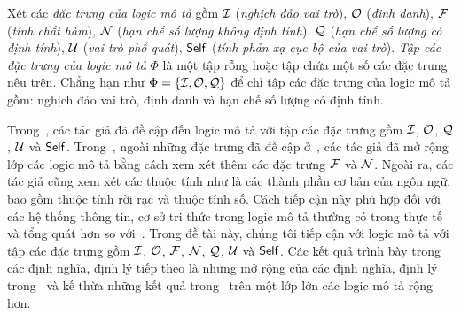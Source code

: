 Xét các {\em đặc trưng của logic mô tả} gồm $\mathcal{I}$ ({\em nghịch đảo vai trò}), $\mathcal{O}$ ({\em định danh}), $\mathcal{F}$ ({\em tính chất hàm}), $\mathcal{N}$ ({\em hạn chế số lượng không định tính}), $\mathcal{Q}$ ({\em hạn chế số lượng có định tính}), $\mathcal{U}$ ({\em vai trò phổ quát}), $\mathsf{Self}$ ({\em tính phản xạ cục bộ của vai trò}). {\em Tập các đặc trưng của logic mô tả} $\Phi$ là một tập rỗng hoặc tập chứa một số các đặc trưng nêu trên. Chẳng hạn như $\Phi = \{\mathcal{I}, \mathcal{O}, \mathcal{Q}\}$ để chỉ tập các đặc trưng của logic mô tả gồm: nghịch đảo vai trò, định danh và hạn chế số lượng có định tính.

Trong~\cite{Divroodi2011B,Nguyen2013}, các tác giả đã đề cập đến logic mô tả \ALCreg với tập các đặc trưng gồm $\mathcal{I}$, $\mathcal{O}$, $\mathcal{Q}$, $\mathcal{U}$ và $\mathsf{Self}$. 
Trong~\cite{Tran2012,Ha2012}, ngoài những đặc trưng đã đề cập ở~\cite{Divroodi2011B,Nguyen2013}, các tác giả đã mở rộng lớp các logic mô tả bằng cách xem xét thêm các đặc trưng $\mathcal{F}$ và $\mathcal{N}$. Ngoài ra, các tác giả cũng xem xét các thuộc tính như là các thành phần cơ bản của ngôn ngữ, bao gồm thuộc tính rời rạc và thuộc tính số. Cách tiếp cận này phù hợp đối với các hệ thống thông tin, cơ sở tri thức trong logic mô tả thường có trong thực tế và tổng quát hơn so với~\cite{Nguyen2013}.
Trong đề tài này, chúng tôi tiếp cận với logic mô tả \ALCreg với tập các đặc trưng gồm $\mathcal{I}$, $\mathcal{O}$, $\mathcal{F}$, $\mathcal{N}$, $\mathcal{Q}$, $\mathcal{U}$ và $\mathsf{Self}$. Các kết quả trình bày trong các định nghĩa, định lý tiếp theo là những mở rộng của các định nghĩa, định lý trong~\cite{Divroodi2011B,Nguyen2013} và kế thừa những kết quả trong~\cite{Tran2012,Ha2012} trên một lớp lớn các logic mô tả rộng hơn.

